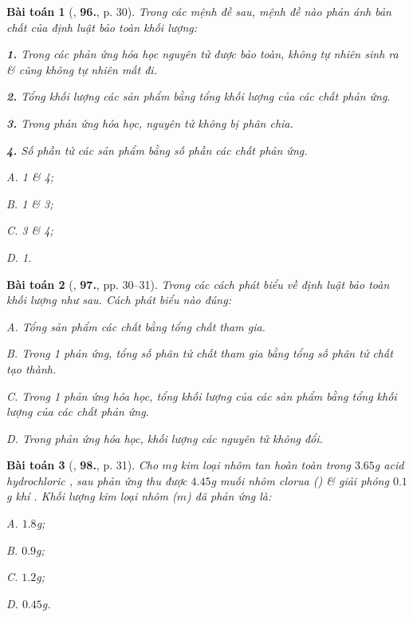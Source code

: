 \documentclass{article}
\numberwithin{equation}{section}
\newtheorem{baitoan}{Bài toán}[section]
\begin{document}
\begin{baitoan}[\cite{An2011}, \textbf{96.}, p. 30]
	Trong các mệnh đề sau, mệnh đề nào phản ánh bản chất của định luật bảo toàn khối lượng:
	\begin{enumerate*}
		\item[\textbf{1.}] Trong các phản ứng hóa học nguyên tử được bảo toàn, không tự nhiên sinh ra \& cũng không tự nhiên mất đi.
		\item[\textbf{2.}] Tổng khối lượng các sản phẩm bằng tổng khối lượng của các chất phản ứng.
		\item[\textbf{3.}] Trong phản ứng hóa học, nguyên tử không bị phân chia.
		\item[\textbf{4.}] Số phần tử các sản phẩm bằng số phần các chất phản ứng.
	\end{enumerate*}

	\begin{enumerate*}
		\item[{\rm\sf A.}] 1 \& 4;
		\item[{\rm\sf B.}] 1 \& 3;
		\item[{\rm\sf C.}] 3 \& 4;
		\item[{\rm\sf D.}] 1.
	\end{enumerate*}
\end{baitoan}

\begin{baitoan}[\cite{An2011}, \textbf{97.}, pp. 30--31]
	Trong các cách phát biểu về định luật bảo toàn khối lượng như sau. Cách phát biểu nào đúng:
	\begin{enumerate*}
		\item[{\rm\sf A.}] Tổng sản phẩm các chất bằng tổng chất tham gia.
		\item[{\rm\sf B.}] Trong 1 phản ứng, tổng số phân tử chất tham gia bằng tổng số phân tử chất tạo thành.
		\item[{\rm\sf C.}] Trong 1 phản ứng hóa học, tổng khối lượng của các sản phẩm bằng tổng khối lượng của các chất phản ứng.
		\item[{\rm\sf D.}] Trong phản ứng hóa học, khối lượng các nguyên tử không đổi.
	\end{enumerate*}
\end{baitoan}

\begin{baitoan}[\cite{An2011}, \textbf{98.}, p. 31]
	Cho $m$g kim loại nhôm tan hoàn toàn trong $3.65$g acid hydrochloric , sau phản ứng thu được $4.45$g muối nhôm clorua () \& giải phóng $0.1$g khí . Khối lượng kim loại nhôm ($m$) đã phản ứng là:
	\begin{enumerate*}
		\item[{\rm\sf A.}] $1.8$g;
		\item[{\rm\sf B.}] $0.9$g;
		\item[{\rm\sf C.}] $1.2$g;
		\item[{\rm\sf D.}] $0.45$g.
	\end{enumerate*}
\end{baitoan}
\end{document}
